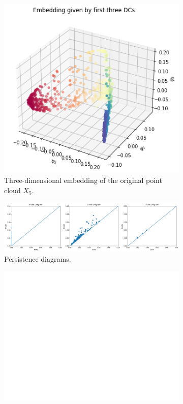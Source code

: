\begin{figure}[H]
\centering
\begin{subfigure}[b]{0.2\textwidth}
    \includegraphics[width=\textwidth]{figures/X5_embedding.png}
    \caption{Three-dimensional embedding of the original point cloud $X_5$.}
\end{subfigure}
\hfill
\begin{subfigure}[b]{0.75\textwidth}
    \includegraphics[width=\textwidth]{figures/X5_H0.png}
    \caption{Persistence diagrams.}
\end{subfigure}
\begin{subfigure}[b]{0.25\textwidth}
\includegraphics[width=\textwidth]{figures/white.png} 

\end{subfigure}
\end{figure}
